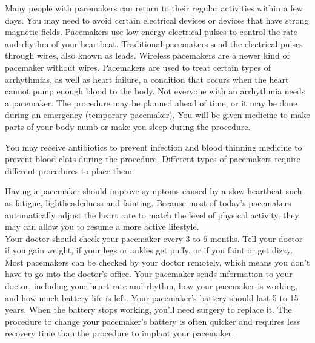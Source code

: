 \documentclass[a4paper,12pt]{article}
\begin{document}
 Many people with pacemakers can return to their regular activities within a few days. You may need to avoid certain electrical devices or devices that have strong magnetic fields.
 Pacemakers use low-energy electrical pulses to control the rate and rhythm of your heartbeat. Traditional pacemakers send the electrical pulses through wires, also known as leads. Wireless pacemakers are a newer kind of pacemaker without wires.
 Pacemakers are used to treat certain types of arrhythmias, as well as heart failure, a condition that occurs when the heart cannot pump enough blood to the body. Not everyone with an arrhythmia needs a pacemaker.
 The procedure may be planned ahead of time, or it may be done during an emergency (temporary pacemaker). You will be given medicine to make parts of your body numb or make you sleep during the procedure. 
 
 You may receive antibiotics to prevent infection and blood thinning medicine to prevent blood clots during the procedure. Different types of pacemakers require different procedures to place them.
 
 Having a pacemaker should improve symptoms caused by a slow heartbeat such as fatigue, lightheadedness and fainting. Because most of today's pacemakers automatically adjust the heart rate to match the level of physical activity, they may can allow you to resume a more active lifestyle.
 \\

Your doctor should check your pacemaker every 3 to 6 months. Tell your doctor if you gain weight, if your legs or ankles get puffy, or if you faint or get dizzy.
\\

Most pacemakers can be checked by your doctor remotely, which means you don't have to go into the doctor's office. Your pacemaker sends information to your doctor, including your heart rate and rhythm, how your pacemaker is working, and how much battery life is left.
Your pacemaker's battery should last 5 to 15 years. When the battery stops working, you'll need surgery to replace it. The procedure to change your pacemaker's battery is often quicker and requires less recovery time than the procedure to implant your pacemaker.
 
\end{document}
